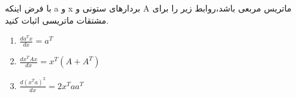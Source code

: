 با فرض اینکه a و x بردارهای ستونی و A ماتریس مربعی باشد،‌روابط زیر را برای مشتقات ماتریسی اثبات کنید.

\begin{enumerate}[label=(\alph*)]
	
	\item
	$
	\frac{{d{a^T}x}}{{dx}} = {a^T}
	$
	
	\item
	$
	\frac{{d{x^T}Ax}}{{dx}} = {x^T}(A + {A^T})
	$
	
	\item
	$
	\frac{{d{{\left( {{x^T}a} \right)}^2}}}{{dx}} = 2{x^T}a{a^T}
	$
	
	
\end{enumerate}